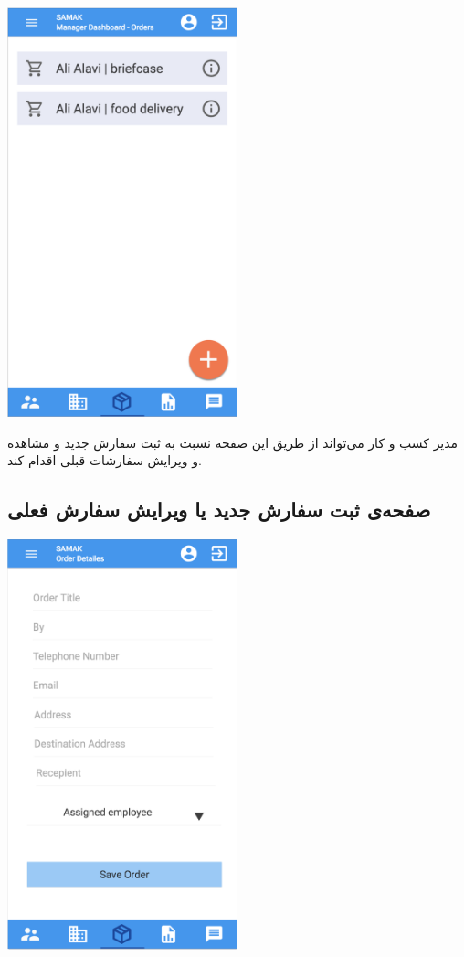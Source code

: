 \begin{center}
\includegraphics[width = 0.5\textwidth]{images/13-orders.png}
\end{center}

مدیر کسب و کار می‌تواند از طریق این صفحه نسبت به ثبت سفارش جدید و مشاهده و ویرایش سفارشات قبلی اقدام کند.



\subsection{صفحه‌ی ثبت سفارش جدید یا ویرایش سفارش فعلی}

\begin{center}
\includegraphics[width = 0.5\textwidth]{images/14-new-order-edit-order.png}
\end{center}

